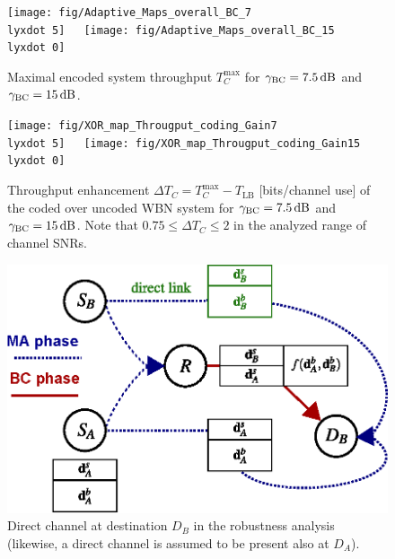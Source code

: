 \documentclass{article}
\newcommand{\lyxdot}{.}
\begin{document}
\begin{figure}
\centering{}\texttt{[image: fig/Adaptive\_Maps\_overall\_BC\_7\\lyxdot 5]}~~~\texttt{[image: fig/Adaptive\_Maps\_overall\_BC\_15\\lyxdot 0]}\caption{Maximal encoded system throughput $T_{C}^{\mathrm{max}}$ for $\gamma_{{\rm {BC}}}=7.5\,\mathrm{dB}$
and $\gamma_{{\rm {BC}}}=15\,\mathrm{dB}$.\label{fig:CTUpp_Coded_SNR_map} }
\end{figure}


\begin{figure}
\centering{}\texttt{[image: fig/XOR\_map\_Througput\_coding\_Gain7\\lyxdot 5]}~~~\texttt{[image: fig/XOR\_map\_Througput\_coding\_Gain15\\lyxdot 0]}\caption{Throughput enhancement $\Delta T_{C}=T_{C}^{\mathrm{max}}-T_{\mathrm{LB}}$
{[}bits/channel use{]} of the coded over uncoded WBN system for $\gamma_{{\rm {BC}}}=7.5\,\mathrm{dB}$
and $\gamma_{{\rm {BC}}}=15\,\mathrm{dB}$. Note that $0.75\leq\Delta T_{C}\leq2$
in the analyzed range of channel SNRs.\label{fig:CTUpp_Coded_ThroughputGain}}
\end{figure}


\begin{figure}
\begin{centering}
\includegraphics[width=0.75\columnwidth]{fig/2-SRN-sc_principle_BC-TWT_directLink}
\par\end{centering}

\centering{}\caption{Direct channel at destination $D_{B}$ in the robustness analysis
(likewise, a direct channel is assumed to be present also at $D_{A}$).\label{fig:CTUpp_DirectChannel}}
\end{figure}
\end{document}
